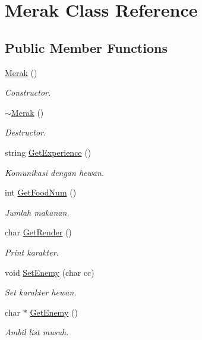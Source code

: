 \hypertarget{class_merak}{}\section{Merak Class Reference}
\label{class_merak}
\subsection*{Public Member Functions}
\begin{DoxyCompactItemize}
\item 
\hyperlink{class_merak_abc8e0d235b1fadd0e522f2e8f84677e6}{Merak} ()\hypertarget{class_merak_abc8e0d235b1fadd0e522f2e8f84677e6}{}\label{class_merak_abc8e0d235b1fadd0e522f2e8f84677e6}

\begin{DoxyCompactList}\small\item\em Constructor. \end{DoxyCompactList}\item 
\hyperlink{class_merak_a022375e5e76dda9db65d6d46b217eee1}{$\sim$\+Merak} ()\hypertarget{class_merak_a022375e5e76dda9db65d6d46b217eee1}{}\label{class_merak_a022375e5e76dda9db65d6d46b217eee1}

\begin{DoxyCompactList}\small\item\em Destructor. \end{DoxyCompactList}\item 
string \hyperlink{class_merak_aecc0ca605df25195981f2faeb354b8e2}{Get\+Experience} ()\hypertarget{class_merak_aecc0ca605df25195981f2faeb354b8e2}{}\label{class_merak_aecc0ca605df25195981f2faeb354b8e2}

\begin{DoxyCompactList}\small\item\em Komunikasi dengan hewan. \end{DoxyCompactList}\item 
int \hyperlink{class_merak_a26c1ae4b0ee2781c6f601b5e22deecc6}{Get\+Food\+Num} ()
\begin{DoxyCompactList}\small\item\em Jumlah makanan. \end{DoxyCompactList}\item 
char \hyperlink{class_merak_a7f39bd60fe12f24769d1f2bf42b1fdd7}{Get\+Render} ()
\begin{DoxyCompactList}\small\item\em Print karakter. \end{DoxyCompactList}\item 
void \hyperlink{class_merak_a68c00568fab98e4e02ec4a84bb582463}{Set\+Enemy} (char cc)
\begin{DoxyCompactList}\small\item\em Set karakter hewan. \end{DoxyCompactList}\item 
char $\ast$ \hyperlink{class_merak_aec4d007180b1f9dc20ed95e9e6736c00}{Get\+Enemy} ()
\begin{DoxyCompactList}\small\item\em Ambil list musuh. \end{DoxyCompactList}\end{DoxyCompactItemize}
